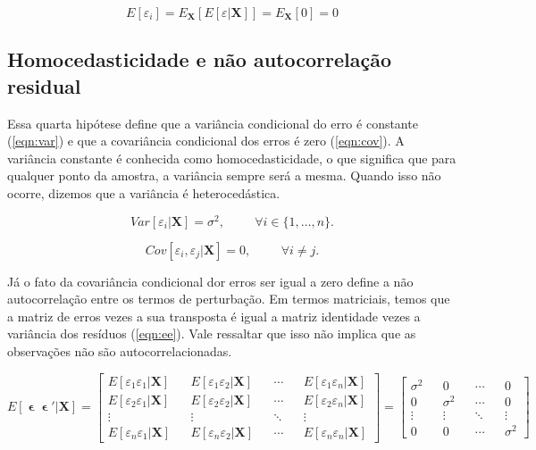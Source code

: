 \documentclass[a4paper,12pt]{article}
\begin{document}
\begin{equation}
\label{eqn:expectations}
E[\varepsilon_i] = E_{\textbf{X}}[E[\varepsilon | \textbf{X}]] = E_{\textbf{X}}[0] = 0
\end{equation}

\hypertarget{homocedasticidade-e-nuxe3o-autocorrelauxe7uxe3o-residual}{%
\subsection{Homocedasticidade e não autocorrelação
residual}\label{homocedasticidade-e-nuxe3o-autocorrelauxe7uxe3o-residual}}

Essa quarta hipótese define que a variância condicional do erro é
constante (\ref{eqn:var}) e que a covariância condicional dos erros é
zero (\ref{eqn:cov}). A variância constante é conhecida como
homocedasticidade, o que significa que para qualquer ponto da amostra, a
variância sempre será a mesma. Quando isso não ocorre, dizemos que a
variância é heterocedástica.

\begin{equation}
\label{eqn:var}
Var[\varepsilon_i | \textbf{X}] = \sigma^2, \hspace{1cm} \forall i \in \{1, \dots, n\}.
\end{equation}

\begin{equation}
\label{eqn:cov}
Cov[\varepsilon_i, \varepsilon_j | \textbf{X}] = 0, \hspace{1cm} \forall i \neq j.
\end{equation}

Já o fato da covariância condicional dor erros ser igual a zero define a
não autocorrelação entre os termos de perturbação. Em termos matriciais,
temos que a matriz de erros vezes a sua transposta é igual a matriz
identidade vezes a variância dos resíduos (\ref{eqn:ee}). Vale ressaltar
que isso não implica que as observações não são autocorrelacionadas.

\begin{equation}
\label{eqn:ee}
E[\mbfvarepsilon \mbfvarepsilon' | \textbf{X}] =
\begin{bmatrix}
E[\varepsilon_1 \varepsilon_1 | \textbf{X}] && E[\varepsilon_1 \varepsilon_2 | \textbf{X}] && \cdots && E[\varepsilon_1 \varepsilon_n | \textbf{X}] \\
E[\varepsilon_2 \varepsilon_1 | \textbf{X}] && E[\varepsilon_2 \varepsilon_2 | \textbf{X}] && \cdots && E[\varepsilon_2 \varepsilon_n | \textbf{X}] \\
\vdots && \vdots && \ddots && \vdots \\
E[\varepsilon_n \varepsilon_1 | \textbf{X}] && E[\varepsilon_n \varepsilon_2 | \textbf{X}] && \cdots && E[\varepsilon_n \varepsilon_n | \textbf{X}]
\end{bmatrix} =
\begin{bmatrix}
\sigma^2 && 0 && \cdots && 0 \\
0 && \sigma^2 && \cdots && 0 \\
\vdots && \vdots && \ddots && \vdots \\
0 && 0 && \cdots && \sigma^2
\end{bmatrix}
\end{equation}
\end{document}
